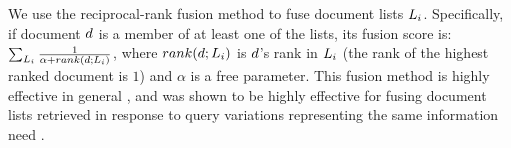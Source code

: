  We use the reciprocal-rank fusion method
\cite{Cormack+al:09a} to fuse document lists
$L_i$. Specifically, if document $d$ is a member of at least
one of the lists, its fusion score is: $\sum_{L_i} \frac{1}{\alpha + rank(d;L_i)}$, where
  $rank(d;L_i)$ is $d$'s rank in $L_i$ (the rank of the highest ranked document is $1$) and
  $\alpha$ is a free parameter. This fusion method is highly effective in general \cite{Anava+al:16a}, and was shown to be highly effective for fusing document lists retrieved in response to query variations representing the same information need \cite{bailey2017retrieval,bc17-adcs}.
